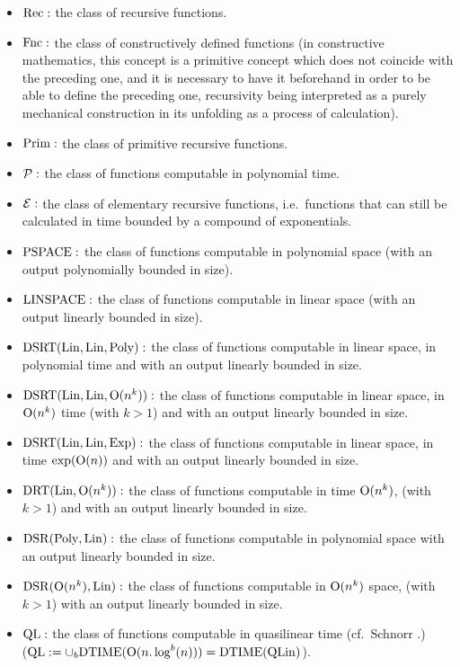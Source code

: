 \begin{itemize}

\item 
 
${\rm Rec}:$ the class of recursive functions.

\item 
 
${\rm Fnc}:$ the class of constructively defined functions (in constructive mathematics, this concept is a primitive concept which does not coincide with the preceding one, and it is necessary to have it beforehand in order to be able to define the preceding one, recursivity being interpreted as a purely mechanical construction in its unfolding as a process of calculation).

\item ${\rm Prim}:$ the class of primitive recursive functions.

\item ${\cal P} :$ the class of functions computable in polynomial time.

\item  ${\cal E}:$ the class of elementary recursive functions, i.e.\ functions that can still be calculated in time bounded by a compound of exponentials.

\item ${\rm PSPACE}:$ the class of functions computable in polynomial space (with an output polynomially bounded in size).

\item ${\rm LINSPACE}:$ the class of functions computable in linear space (with an output linearly bounded in size).

\item ${\rm DSRT}({\rm Lin}, {\rm Lin}, {\rm Poly}):$ the class of functions computable in linear space, in polynomial time and with an output linearly bounded in size.

\item ${\rm DSRT}({\rm Lin}, {\rm Lin}, {\rm O}(n^k)):$ the class of functions computable in linear space, in ${\rm O}(n^k)$ time (with $k > 1$) and with an output linearly bounded in size.

\item ${\rm DSRT}({\rm Lin}, {\rm Lin}, {\rm Exp}):$ the class of functions computable in linear space, in time $\exp({\rm O}(n))$ and with an output linearly bounded in size.

\item ${\rm DRT}({\rm Lin}, {\rm O}(n^k)):$ the class of functions computable in time ${\rm O}(n^k)$, (with $k > 1$) and with an output linearly bounded in size.

\item ${\rm DSR}({\rm Poly}, {\rm Lin}):$ the class of functions computable in polynomial space with an output linearly bounded in size.

\item ${\rm DSR}({\rm O}(n^k), {\rm Lin}):$ the class of functions computable in ${\rm O}(n^k)$ space, (with $k > 1$) with an output linearly bounded in size.

\item ${\rm QL}:$ the class of functions computable in quasilinear time (cf.\ Schnorr \cite{Sc}.)  \\(${\rm QL}: = \cup_b {\rm DTIME} ({\rm O}(n.\log^b(n))) = {\rm DTIME} ({\rm QLin})$).
\end{itemize}
